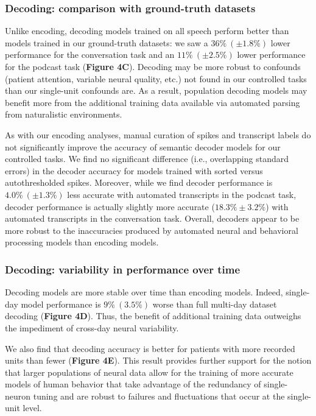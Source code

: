 \documentclass[pdflatex,sn-basic]{sn-jnl}%
\theoremstyle{thmstyleone}%
\theoremstyle{thmstyletwo}%
\theoremstyle{thmstylethree}%
\begin{document}
\subsubsection{Decoding: comparison with ground-truth datasets}

Unlike encoding, decoding models trained on all speech perform better than models trained in our ground-truth datasets: we saw a $36\%~(\pm 1.8\%)$ lower performance for the conversation task and an $11\%~(\pm 2.5\%)$ lower performance for the podcast task (\textbf{Figure 4C}). Decoding may be more robust to confounds (patient attention, variable neural quality, etc.) not found in our controlled tasks than our single-unit confounds are. As a result, population decoding models may benefit more from the additional training data available via automated parsing from naturalistic environments.

As with our encoding analyses, manual curation of spikes and transcript labels do not significantly improve the accuracy of semantic decoder models for our controlled tasks. We find no significant difference (i.e., overlapping standard errors) in the decoder accuracy for models trained with sorted versus autothresholded spikes. Moreover, while we find decoder performance is $4.0\%~(\pm 1.3\%)$ less accurate with automated transcripts in the podcast task, decoder performance is actually slightly more accurate ($18.3\% \pm 3.2\%$) with automated transcripts in the conversation task. Overall, decoders appear to be more robust to the inaccuracies produced by automated neural and behavioral processing models than encoding models.

\subsubsection{Decoding: variability in performance over time}

Decoding models are more stable over time than encoding models. Indeed, single-day model performance is $9\%~(3.5\%)$ worse than full multi-day dataset decoding (\textbf{Figure 4D}). Thus, the benefit of additional training data outweighs the impediment of cross-day neural variability.

We also find that decoding accuracy is better for patients with more recorded units than fewer (\textbf{Figure 4E}). This result provides further support for the notion that larger populations of neural data allow for the training of more accurate models of human behavior that take advantage of the redundancy of single-neuron tuning \citep{bib64,bib65,bib61} and are robust to failures and fluctuations that occur at the single-unit level.
\end{document}
